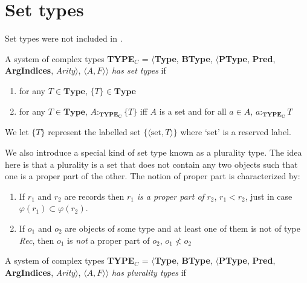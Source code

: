 \section{Set types}
\label{app:settypes}

Set types were not included in \cite{Cooper2012}.

A system of complex types {\bf TYPE$_C$} = $\langle${\bf Type}, {\bf BType},
$\langle$\textbf{PType}, {\bf Pred}, \textbf{ArgIndices}, {\it Arity\/}$\rangle$, $\langle A,F\rangle$$\rangle$ \textit{has set types} if
\begin{enumerate} 
 
\item for any $T \in \textbf{Type}$, $\{T\} \in \textbf{Type}$ 
 
\item for any $T \in \textbf{Type}$, 
$A:_{\mathbf{TYPE_C}}\{T\}$ iff  $A$ is a set and 
  for all $a\in A$, $a:_{\mathbf{TYPE_C}}T$
   
 
\end{enumerate}

We let $\{T\}$ represent the labelled set
$\{\langle\mathrm{set},T\rangle\}$ where `set' is a reserved
label.

We also introduce a special kind of set type known as a plurality
type.  The idea here is that a plurality is a set that does not contain any two
objects such that one is a proper part of the other.  The notion of
proper part is characterized by:
\begin{enumerate}
\item If $r_1$ and $r_2$ are records then $r_1$ \textit{is a proper
    part of} $r_2$, $r_1<r_2$, just in case $\varphi(r_1)\subset\varphi(r_2)$. 
 
\item If $o_1$ and $o_2$ are objects of some type and at least one of
  them is not of type \textit{Rec}, then $o_1$ is \textit{not} a
  proper part of $o_2$, $o_1\not<o_2$ 
\end{enumerate}

A system of complex types {\bf TYPE$_C$} = $\langle${\bf Type}, {\bf BType},
$\langle$\textbf{PType}, {\bf Pred}, \textbf{ArgIndices}, {\it Arity\/}$\rangle$, $\langle A,F\rangle$$\rangle$ \textit{has plurality types} if
  
